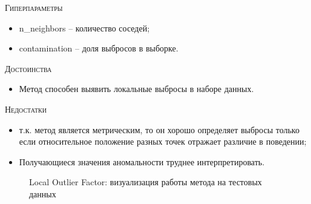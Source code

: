 \documentclass[12pt]{article}
\begin{document}
    \noindent \textsc{Гиперпараметры}
    \begin{itemize}
        \item n\_neighbors -- количество соседей;
        \item contamination – доля выбросов в выборке.
    \end{itemize}

    \noindent \textsc{Достоинства}
    \begin{itemize}
        \item Метод способен выявить локальные выбросы в наборе данных.
    \end{itemize}
    
    \noindent \textsc{Недостатки}
    \begin{itemize}
        \item т.к. метод является метрическим, то он хорошо определяет выбросы только если относительное положение разных точек отражает различие в поведении;
        \item Получающиеся значения аномальности труднее интерпретировать.
    \end{itemize}

    \begin{figure}[h!]
        \centering
        \caption{Local Outlier Factor: визуализация работы метода на тестовых данных}
        \label{sec:Research:Model:Visualization:fig:LocalOutlierFactor}
    \end{figure}
\end{document}
